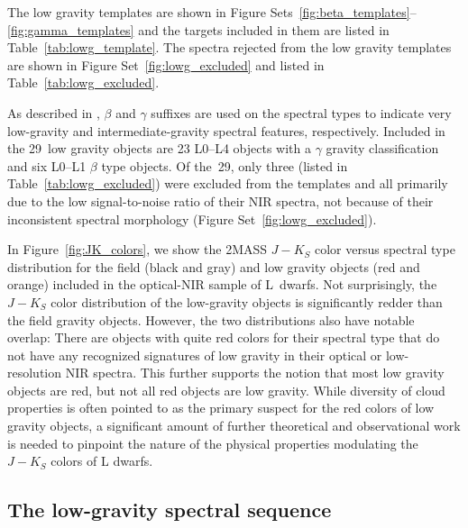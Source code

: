 \documentclass[12pt,preprint]{aastex}
\newcommand{\optLowG}{29}
\begin{document}
The low gravity templates are shown in Figure Sets~\ref{fig:beta_templates}--\ref{fig:gamma_templates} and the targets included in them are listed in Table~\ref{tab:lowg_template}.
The spectra rejected from the low gravity templates are shown in Figure Set~\ref{fig:lowg_excluded} and listed in Table~\ref{tab:lowg_excluded}.

As described in \cite{Cruz09_lowg}, $\beta$ and $\gamma$ suffixes are used on the spectral types to indicate very low-gravity and intermediate-gravity spectral features, respectively.
Included in the \optLowG~low gravity objects are 23 L0--L4 objects with a $\gamma$ gravity classification and six L0--L1 $\beta$ type objects.
Of the~\optLowG, only three (listed in Table~\ref{tab:lowg_excluded}) were excluded from the templates and all primarily due to the low signal-to-noise ratio of their NIR spectra, not because of their inconsistent spectral morphology (Figure Set~\ref{fig:lowg_excluded}).

In Figure~\ref{fig:JK_colors}, we show the 2MASS $J-K_S$ color versus spectral type distribution for the field (black and gray) and low gravity objects (red and orange) included in the optical-NIR sample of L~dwarfs.
Not surprisingly, the $J-K_S$ color distribution of the low-gravity objects is significantly redder than the field gravity objects. 
However, the two distributions also have notable overlap: There are objects with quite red colors for their spectral type that do not have any recognized signatures of low gravity in their optical or low-resolution NIR spectra.
This further supports the notion that most low gravity objects are red, but not all red objects are low gravity.
While diversity of cloud properties is often pointed to as the primary suspect for the red colors of low gravity objects, a significant amount of further theoretical and observational work is needed to pinpoint the nature of the physical properties modulating the $J-K_S$ colors of L dwarfs.

\subsection{The low-gravity spectral sequence}
\end{document}
